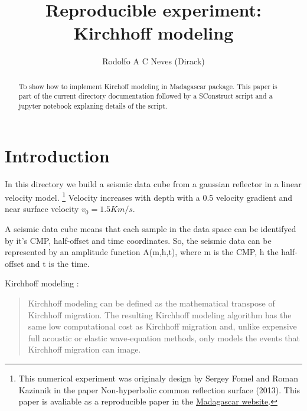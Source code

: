 \title{Reproducible experiment: Kirchhoff modeling}

\author{Rodolfo A C Neves (Dirack)}
\begin{abstract}
To show how to implement Kirchoff modeling in Madagascar
package. This paper is part of the current directory 
documentation followed by a SConstruct script and a jupyter
notebook explaning details of the script.
\end{abstract}

\section{Introduction}

\indent In this directory we build a seismic data cube from a gaussian reflector in a linear velocity model.
\footnote{This numerical experiment was originaly 
design by Sergey Fomel and Roman Kazinnik in 
the paper Non-hyperbolic common reflection surface
(2013). 
This paper is avaliable as a reproducible paper in
the \href{http://www.ahay.org}{Madagascar website}.}
Velocity increases with depth with a 0.5 
velocity gradient and near surface velocity 
$v_0=1.5Km/s$.

\indent A seismic data cube means that each sample
in the data space can be identifyed by it's CMP, 
half-offset and time coordinates. So, the seismic 
data can be represented by an amplitude function
A(m,h,t), where m is the CMP, h the half-offset
and t is the time.

Kirchhoff modeling \cite[]{km}:

\begin{quote}
Kirchhoff modeling can be defined as the 
mathematical transpose of Kirchhoff migration.
The resulting Kirchhoff modeling algorithm 
has the same low computational cost as 
Kirchhoff migration and, unlike expensive full 
acoustic or elastic wave‐equation methods, 
only models the events that Kirchhoff migration
can image.
\end{quote}






